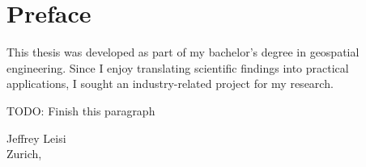 \chapter*{Preface}

This thesis was developed as part of my bachelor's degree in geospatial engineering. Since I enjoy translating scientific findings into practical applications, I sought an industry-related project for my research.

\begin{comment}
Before my studies, I worked for several years in mobile network planning, where I had the opportunity to accompany dozens of telecommunications sites from the initial site survey to the building permit application. By chance, on a cold winter day, I found my bachelor's thesis topic over a lunch meeting with my former colleague, Jean-Charles Schaeggi. He supervised me on behalf of Axians, for which I am very grateful.

Furthermore, I would like to extend my special thanks to Helena Laasch from the Institute for Geosensors and Engineering Geodesy. She was my first point of contact at ETH. Because the institute did not have much practical BIM expertise, she connected me with the Institute of Construction and Infrastructure Management, where I found my two supervisors, Océane Durand Maniclas and Kasimir Forth...
\end{comment}

TODO: Finish this paragraph

\begin{flushright}
Jeffrey Leisi \\
Zurich, \the\year
\end{flushright}